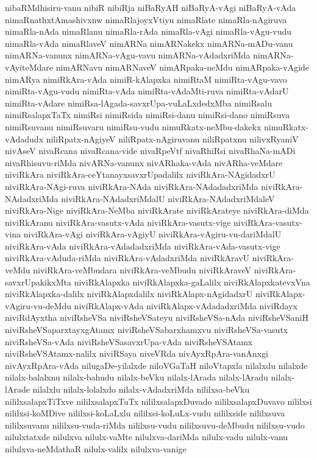 {nibaRMdhisiru-vanu
nibiR
nibiRja
niBaRyAH
niBaRyA-vAgi
niBaRyA-vAda
nimaRnathxtAmashivxnw
nimaRlajoyxVtiyu
nimaRlate
nimaRla-nAgiruva
nimaRla-nAda
nimaRlanu
nimaRla-rAda
nimaRla-vAgi
nimaRla-vAgu-vudu
nimaRla-vAda
nimaRlaveV
nimARNa
nimARNakekx
nimARNa-mADu-vanu
nimARNa-vanunx
nimARNa-vAgu-vavu
nimARNa-vAdadxriMda
nimARNa-vAyiteMdare
nimARNavu
nimARNaveV
nimARpaka-neMdu
nimARpaka-vAgide
nimARya
nimiRkAra-vAda
nimiR-kAlapxka
nimiRtaM
nimiRta-vAgu-vavo
nimiRta-vAgu-vudu
nimiRta-vAda
nimiRta-vAdaMti-ruva
nimiRta-vAdarU
nimiRta-vAdare
nimiRsa-lAgada-savxrUpa-vuLaLxdedxMba
nimiRsalu
nimiRsalapxTaTx
nimiRsi
nimiRsida
nimiRsi-danu
nimiRsi-dano
nimiRsuva
nimiRsuvanu
nimiRsuvaru
nimiRsu-vudu
nimuRkatx-neMbu-dakekx
nimuRkatx-vAdadudx
niliRpatx-nAgiyeV
niliRpatx-nAgiruvanu
niliRpatxnu
nilivxRyaniV
nivAseV
nivaRcana
nivaRcana-vide
nivaRpeVtf
nivaRhiRsi
nivaRhaNa-mADi
nivaRhisuvu-riMda
nivARNa-vanunx
nivARhaka-vAda
nivARha-veMdare
niviRkAra
niviRkAra-ceYtanayxsavxrUpadalilx
niviRkAra-NAgidadxrU
niviRkAra-NAgi-ruva
niviRkAra-NAda
niviRkAra-NAdadadxriMda
niviRkAra-NAdadxriMda
niviRkAra-NAdadxriMdalU
niviRkAra-NAdadxriMdaleV
niviRkAra-Nige
niviRkAra-NeMba
niviRkArate
niviRkArateye
niviRkAra-diMda
niviRkAranu
niviRkAra-vasutx-vAda
niviRkAra-vasutx-vige
niviRkAra-vasutx-vina
niviRkAra-vAgi
niviRkAra-vAgiyU
niviRkAra-vAgiru-vu-dariMdalU
niviRkAra-vAda
niviRkAra-vAdadadxriMda
niviRkAra-vAda-vasutx-vige
niviRkAra-vAduda-riMda
niviRkAra-vAdadxriMda
niviRkAravU
niviRkAra-veMdu
niviRkAra-veMbudara
niviRkAra-veMbudu
niviRkAraveV
niviRkAra-savxrUpakikxMta
niviRkAlapxka
niviRkAlapxka-gaLalilx
niviRkAlapxkatevxVna
niviRkAlapxka-dalilx
niviRkAlapxdalilx
niviRkAlapx-nAgidadxrU
niviRkAlapx-vAgiru-vu-deMdu
niviRkAlapx-vAda
niviRkAlapx-vAdadadxriMda
niviRdayx
niviRdAyxtha
niviRsheVSa
niviRsheVSateyu
niviRsheVSa-nAda
niviRsheVSaniH
niviRsheVSaparxtayxgAtamx
niviRsheVSabarxhamxvu
niviRsheVSa-vasutx
niviRsheVSa-vAda
niviRsheVSasavxrUpa-vAda
niviRsheVSAtamx
niviRsheVSAtamx-nalilx
niviRSaya
niveVRda
nivAyxRpAra-vanAnxgi
nivAyxRpAra-vAda
nilugaDe-yilalxde
niloVGaTaH
niloVtapxla
nilalxdu
nilalxde
nilalx-balalxnu
nilalx-bahudu
nilalx-beVku
nilalx-lArada
nilalx-lAradu
nilalx-lArade
nilalxlu
nilalx-lolalxdo
nilalx-vAdadxriMda
nililxsa-beVku
nililxsalapxTiTxve
nililxsalapxTuTx
nililxsalapxDuvado
nililxsalapxDuvavo
nililxsi
nililxsi-koMDive
nililxsi-koLaLxlu
nililxsi-koLuLx-vudu
nililxside
nililxsuva
nililxsuvanu
nililxsu-vuda-riMda
nililxsu-vudu
nililxsuvu-deMbudu
nililxsu-vudo
nilulxtatxde
nilulxva
nilulx-vaMte
nilulxva-dariMda
nilulx-vadu
nilulx-vanu
nilulxva-neMdathaR
nilulx-valilx
nilulxva-vanige
}
